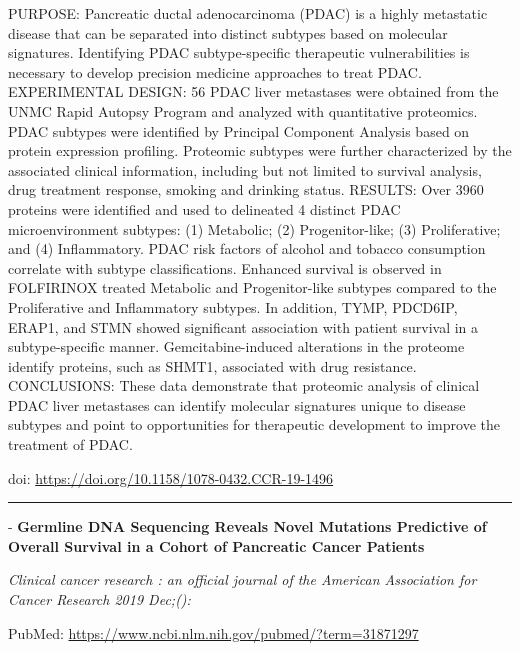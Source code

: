 \documentclass[
]{article}
\renewcommand{\linethickness}{0.05em}
\begin{document}
PURPOSE: Pancreatic ductal adenocarcinoma (PDAC) is a highly metastatic
disease that can be separated into distinct subtypes based on molecular
signatures. Identifying PDAC subtype-specific therapeutic
vulnerabilities is necessary to develop precision medicine approaches to
treat PDAC. EXPERIMENTAL DESIGN: 56 PDAC liver metastases were obtained
from the UNMC Rapid Autopsy Program and analyzed with quantitative
proteomics. PDAC subtypes were identified by Principal Component
Analysis based on protein expression profiling. Proteomic subtypes were
further characterized by the associated clinical information, including
but not limited to survival analysis, drug treatment response, smoking
and drinking status. RESULTS: Over 3960 proteins were identified and
used to delineated 4 distinct PDAC microenvironment subtypes: (1)
Metabolic; (2) Progenitor-like; (3) Proliferative; and (4) Inflammatory.
PDAC risk factors of alcohol and tobacco consumption correlate with
subtype classifications. Enhanced survival is observed in FOLFIRINOX
treated Metabolic and Progenitor-like subtypes compared to the
Proliferative and Inflammatory subtypes. In addition, TYMP, PDCD6IP,
ERAP1, and STMN showed significant association with patient survival in
a subtype-specific manner. Gemcitabine-induced alterations in the
proteome identify proteins, such as SHMT1, associated with drug
resistance. CONCLUSIONS: These data demonstrate that proteomic analysis
of clinical PDAC liver metastases can identify molecular signatures
unique to disease subtypes and point to opportunities for therapeutic
development to improve the treatment of PDAC.

doi: \url{https://doi.org/10.1158/1078-0432.CCR-19-1496}

\begin{center}\rule{0.5\linewidth}{\linethickness}\end{center}

- \textbf{Germline DNA Sequencing Reveals Novel Mutations Predictive of
Overall Survival in a Cohort of Pancreatic Cancer Patients}

\emph{Clinical cancer research : an official journal of the American
Association for Cancer Research 2019 Dec;():}

PubMed: \url{https://www.ncbi.nlm.nih.gov/pubmed/?term=31871297}
\end{document}
